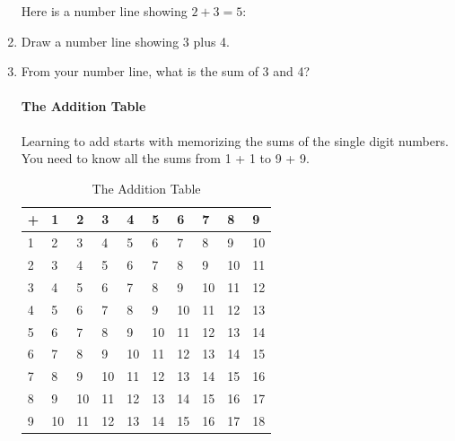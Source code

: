 \documentclass[12pt]{article}
\begin{document}
\begin{enumerate}
Here is a number line showing $2+3=5$:


\item Draw a number line showing 3 plus 4.
\item From your number line, what is the sum of 3 and 4?

\paragraph{The Addition Table}
Learning to add starts with memorizing the sums of the single digit numbers. You need to know all the sums from 1 + 1 to 9 + 9.\\

\begin{table}[h]
\centering
\begin{tabular}{|l|l|l|l|l|l|l|l|l|l|}
\hline
+ & 1  & 2  & 3  & 4  & 5  & 6  & 7  & 8  & 9                       \\ \hline
1 & 2  & 3  & 4  & 5  & 6  & 7  & 8  & 9  & 10                      \\ \hline
2 & 3  & 4  & 5  & 6  & 7  & 8  & 9  & 10 & 11                      \\ \hline
3 & 4  & 5  & 6  & 7  & 8  & 9  & 10 & 11 & 12                      \\ \hline
4 & 5  & 6  & 7  & 8  & 9  & 10 & 11 & 12 & 13                      \\ \hline
5 & 6  & 7  & 8  & 9  & 10 & 11 & 12 & 13 & 14                      \\ \hline
6 & 7  & 8  & 9  & 10 & 11 & 12 & 13 & 14 & 15                      \\ \hline
7 & 8  & 9  & 10 & 11 & 12 & 13 & 14 & 15 & 16                      \\ \hline
8 & 9  & 10 & 11 & 12 & 13 & 14 & 15 & 16 & 17                      \\ \hline
9 & 10 & 11 & 12 & 13 & 14 & 15 & 16 & 17 & \multicolumn{1}{c|}{18} \\ \hline
\end{tabular}
\caption*{The Addition Table}
\end{table}


\end{enumerate}
\end{document}
